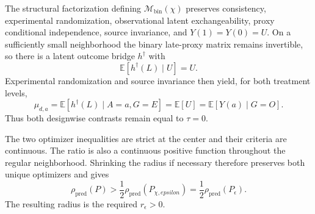 The structural factorization defining \(\mathcal M_{\mathrm{bin}}(\chi)\) preserves consistency, experimental randomization, observational latent exchangeability, proxy conditional independence, source invariance, and \(Y(1)=Y(0)=U\). On a sufficiently small neighborhood the binary late-proxy matrix remains invertible, so there is a latent outcome bridge \(h^\dagger\) with
\[
 \mathbb E[h^\dagger(L)\mid U]=U.
\]
Experimental randomization and source invariance then yield, for both treatment levels,
\[
 \mu_{d,a}
 =\mathbb E[h^\dagger(L)\mid A=a,G=E]
 =\mathbb E[U]
 =\mathbb E[Y(a)\mid G=O].                            \tag{2}
\]
Thus both designwise contrasts remain equal to \(\tau=0\).

The two optimizer inequalities are strict at the center and their criteria are continuous. The ratio is also a continuous positive function throughout the regular neighborhood. Shrinking the radius if necessary therefore preserves both unique optimizers and gives
\[
 \rho_{\mathrm{pred}}(P)
 >\frac12\rho_{\mathrm{pred}}(P_{\chi,epsilon})
 =\frac12\rho_{\mathrm{pred}}(P_\epsilon).
\]
The resulting radius is the required \(r_\epsilon>0\).